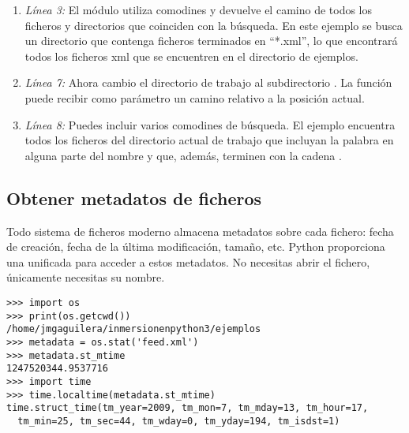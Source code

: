 \begin{enumerate}

\item \emph{Línea 3:} El módulo  utiliza comodines y devuelve el camino de todos los ficheros y directorios que coinciden con la búsqueda. En este ejemplo se busca un directorio que contenga ficheros terminados en ``*.xml'', lo que encontrará todos los ficheros xml que se encuentren en el directorio de ejemplos.

\item \emph{Línea 7:} Ahora cambio el directorio de trabajo al subdirectorio . La función  puede recibir como parámetro un camino relativo a la posición actual.

\item \emph{Línea 8:} Puedes incluir varios comodines de búsqueda. El ejemplo encuentra todos los ficheros del directorio actual de trabajo que incluyan la palabra  en alguna parte del nombre y que, además, terminen con la cadena .

\end{enumerate}

\subsection{Obtener metadatos de ficheros}

Todo sistema de ficheros moderno almacena metadatos sobre cada fichero: fecha de creación, fecha de la última modificación, tamaño, etc. Python proporciona una  unificada para acceder a estos metadatos. No necesitas abrir el fichero, únicamente necesitas su nombre.

\noindent\begin{minipage}{\textwidth}
\begin{lstlisting}[mathescape=True]
>>> import os
>>> print(os.getcwd())
/home/jmgaguilera/inmersionenpython3/ejemplos
>>> metadata = os.stat('feed.xml')
>>> metadata.st_mtime
1247520344.9537716
>>> import time
>>> time.localtime(metadata.st_mtime)
time.struct_time(tm_year=2009, tm_mon=7, tm_mday=13, tm_hour=17,
  tm_min=25, tm_sec=44, tm_wday=0, tm_yday=194, tm_isdst=1)
\end{lstlisting}
\end{minipage}

